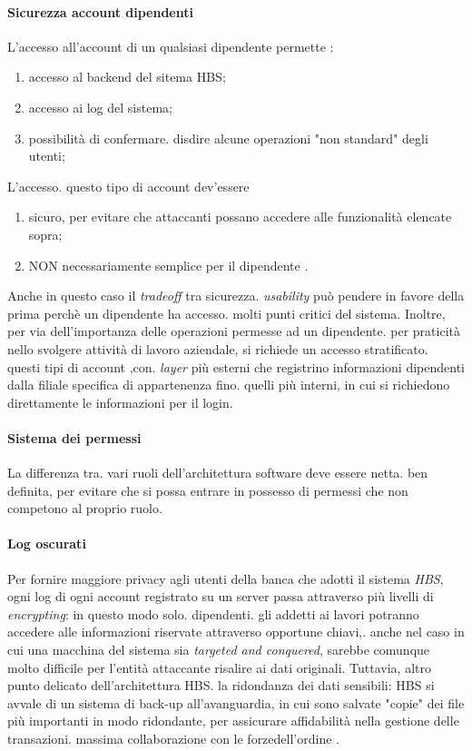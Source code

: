 	\paragraph{Sicurezza account dipendenti}
L'accesso all'account di un qualsiasi dipendente permette :
\begin{enumerate}
\item accesso al backend del sitema HBS;
\item accesso ai log del sistema;
\item possibilità di confermare. disdire alcune operazioni "non standard" degli utenti;
\end{enumerate}
L'accesso. questo tipo di account dev'essere
\begin{enumerate}
\item sicuro, per evitare che attaccanti possano accedere alle funzionalità elencate sopra;
\item NON necessariamente semplice per il dipendente .
\end{enumerate}
Anche in questo caso il \emph{tradeoff} tra sicurezza. \emph{usability} può pendere in favore della prima perchè un dipendente ha accesso. molti punti critici del sistema. Inoltre, per via dell'importanza delle operazioni permesse ad un dipendente. per praticità nello svolgere attività di lavoro aziendale, si richiede un accesso stratificato. questi tipi di account ,con. \emph{layer} più esterni che registrino informazioni dipendenti dalla filiale specifica di appartenenza fino. quelli più interni, in cui si richiedono direttamente le informazioni per il login.


	\paragraph{Sistema dei permessi}
La differenza tra. vari ruoli dell'architettura software deve essere netta. ben definita, per evitare che si possa entrare in possesso di permessi che non competono al proprio ruolo.



	\paragraph{Log oscurati}
Per fornire maggiore privacy agli utenti della banca che adotti il sistema \emph{HBS}, ogni log di ogni account registrato su un server passa attraverso più livelli di \emph{encrypting}: in questo modo solo. dipendenti. gli addetti ai lavori potranno accedere alle informazioni riservate attraverso opportune chiavi,. anche nel caso in cui una macchina del sistema sia \emph{targeted and conquered}, sarebbe comunque molto difficile per l'entità attaccante risalire ai dati originali.
\linebreak
Tuttavia, altro punto delicato dell'architettura HBS. la ridondanza dei dati sensibili: HBS si avvale di un sistema di back-up all'avanguardia, in cui sono salvate "copie" dei file più importanti in modo ridondante, per assicurare affidabilità nella gestione delle transazioni. massima collaborazione con le forzedell'ordine .



